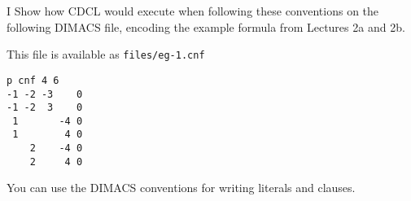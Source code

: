 \snewpage

\begin{problem}{I}
  Show how CDCL would execute when following these conventions on the following
  DIMACS file, encoding the example formula from Lectures 2a and 2b.

  This file is available as \texttt{files/eg-1.cnf}  
  \begin{lstlisting}
p cnf 4 6
-1 -2 -3    0
-1 -2  3    0
 1       -4 0
 1        4 0
    2    -4 0
    2     4 0
  \end{lstlisting}
  You can use the DIMACS conventions for writing literals and clauses.
  
\end{problem}

\snewpage

